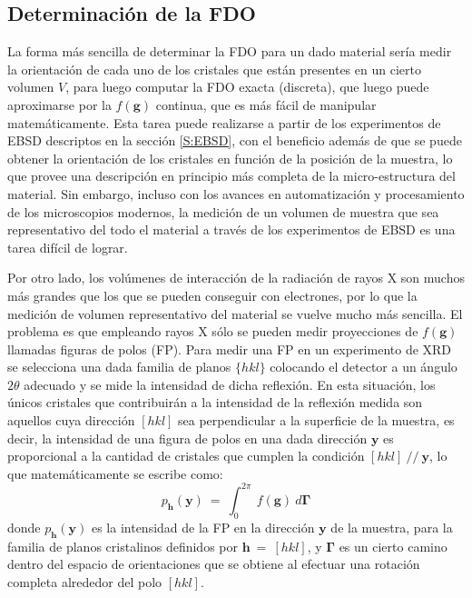 \subsection{Determinación de la FDO}\label{SS:FDO}
La forma más sencilla de determinar la FDO para un dado material sería medir la orientación de cada uno de los cristales que están presentes en un cierto volumen $V$, para luego computar la FDO exacta (discreta), que luego puede aproximarse por la $f(\mathbf{g})$ continua, que es más fácil de manipular matemáticamente.
Esta tarea puede realizarse a partir de los experimentos de EBSD descriptos en la sección \ref{S:EBSD}, con el beneficio además de que se puede obtener la orientación de los cristales en función de la posición de la muestra, lo que provee una descripción en principio más completa de la micro-estructura del material.
Sin embargo, incluso con los avances en automatización y procesamiento de los microscopios modernos, la medición de un volumen de muestra que sea representativo del todo el material a través de los experimentos de EBSD es una tarea difícil de lograr.

Por otro lado, los volúmenes de interacción de la radiación de rayos X son muchos más grandes que los que se pueden conseguir con electrones, por lo que la medición de volumen representativo del material se vuelve mucho más sencilla.
El problema es que empleando rayos X sólo se pueden medir proyecciones de $f(\mathbf{g})$ llamadas figuras de polos (FP).
Para medir una FP en un experimento de XRD se selecciona una dada familia de planos $\{hkl\}$ colocando el detector a un ángulo $2\theta$ adecuado y se mide la intensidad de dicha reflexión.
En esta situación, los únicos cristales que contribuirán a la intensidad de la reflexión medida son aquellos cuya dirección $[hkl]$ sea perpendicular a la superficie de la muestra, es decir, la intensidad de una figura de polos en una dada dirección $\mathbf{y}$ es proporcional a la cantidad de cristales que cumplen la condición $[hkl] \ // \ \mathbf{y}$, lo que matemáticamente se escribe como:
\begin{equation}
  p_{\mathbf{h}}(\mathbf{y}) \ = \ \int_{0}^{2\pi} \ f(\mathbf{g}) \ d\mathbf{\Gamma}
  \label{eq:PDF}
\end{equation}
\noindent
donde $p_{\mathbf{h}}(\mathbf{y})$ es la intensidad de la FP en la dirección $\mathbf{y}$ de la muestra, para la familia de planos cristalinos definidos por $\mathbf{h} \ = \ [hkl]$, y $\mathbf{\Gamma}$ es un cierto camino dentro del espacio de orientaciones que se obtiene al efectuar una rotación completa alrededor del polo $[hkl]$.

